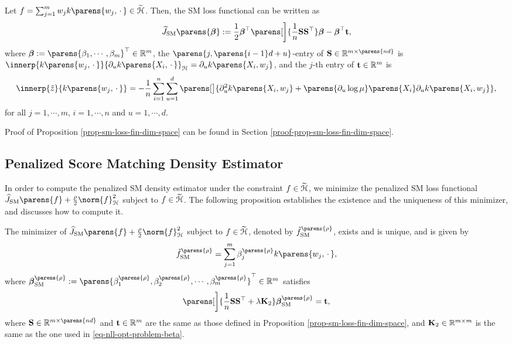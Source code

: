 \begin{proposition}\label{prop-sm-loss-fin-dim-space}
	Let $f = \sum_{j=1}^m w_j k \parens{w_j, \,\cdot\,} \in \widetilde{\calH}$. Then, the SM loss functional can be written as 
	\begin{align*}
		\widetilde{J}_{\SM} \parens{\bbeta} := \frac{1}{2} \bbeta^\top \parens[\bigg]{\frac{1}{n} \bS \bS^\top } \bbeta - \bbeta^\top \bt, 
	\end{align*}
	where $\bbeta := \parens{\beta_1, \cdots, \beta_m}^\top \in \Real^m$, the $\parens{j, \parens{i-1}d + u}$-entry of $\bS \in \Real^{m \times \parens{nd}}$ is $\innerp{k \parens{w_j, \,\cdot\,}}{\partial_u k \parens{X_i, \,\cdot\,}}_{\calH} = \partial_u k \parens{X_i, w_j}$, and the $j$-th entry of $\mathbf{t} \in \mathbb{R}^m$ is 
	\begin{align*}
		\innerp{\hat{z}}{k \parens{w_j, \,\cdot\,}} = - \frac{1}{n} \sum_{i=1}^n \sum_{u=1}^d \parens[\big]{\partial_u^2 k \parens{X_i, w_j} + \parens{\partial_u \log \mu} \parens{X_i} \partial_u k \parens{X_i, w_j}}, 
	\end{align*}
	for all $j = 1, \cdots, m$, $i = 1, \cdots, n$ and $u = 1, \cdots, d$. 
\end{proposition}

Proof of Proposition \ref{prop-sm-loss-fin-dim-space} can be found in Section \ref{proof-prop-sm-loss-fin-dim-space}. 

\subsection{Penalized Score Matching Density Estimator}

In order to compute the penalized SM density estimator under the constraint $f \in \widetilde{\mathcal{H}}$, we minimize the penalized SM loss functional $\widehat{J}_{\SM} \parens{f} + \frac{\rho}{2} \norm{f}_{\calH}^2$ subject to $f \in \widetilde{\mathcal{H}}$. The following proposition establishes the existence and the uniqueness of this minimizer, and discusses how to compute it. 

\begin{proposition}\label{prop-penalized-sm-fin-dim-space}
	The minimizer of $\widehat{J}_{\SM} \parens{f} + \frac{\rho}{2} \norm{f}_{\calH}^2$ subject to $f \in \widetilde{\mathcal{H}}$, denoted by $\tilde{f}_{\SM}^{\parens{\rho}}$, exists and is unique, and is given by 
	\begin{align*}
		\tilde{f}_{\SM}^{\parens{\rho}} = \sum_{j=1}^m \beta_{j}^{\parens{\rho}} k \parens{w_j, \,\cdot\,}, 
	\end{align*}
	where $\bbeta_{\SM}^{\parens{\rho}} := \parens{\beta_{1}^{\parens{\rho}}, \beta_{2}^{\parens{\rho}}, \cdots, \beta_{m}^{\parens{\rho}}}^\top \in \Real^m$ satisfies 
	\begin{align*}
		\parens[\bigg]{\frac{1}{n} \bS \bS^\top + \lambda \bK_2} \bbeta_{\SM}^{\parens{\rho}} = \bt, 
	\end{align*}
	where $\bS \in \Real^{m \times \parens{nd}}$ and $\mathbf{t} \in \mathbb{R}^m$ are the same as those defined in Proposition \ref{prop-sm-loss-fin-dim-space}, and $\mathbf{K}_2 \in \mathbb{R}^{m \times m}$ is the same as the one used in \eqref{eq-nll-opt-problem-beta}. 
\end{proposition}

